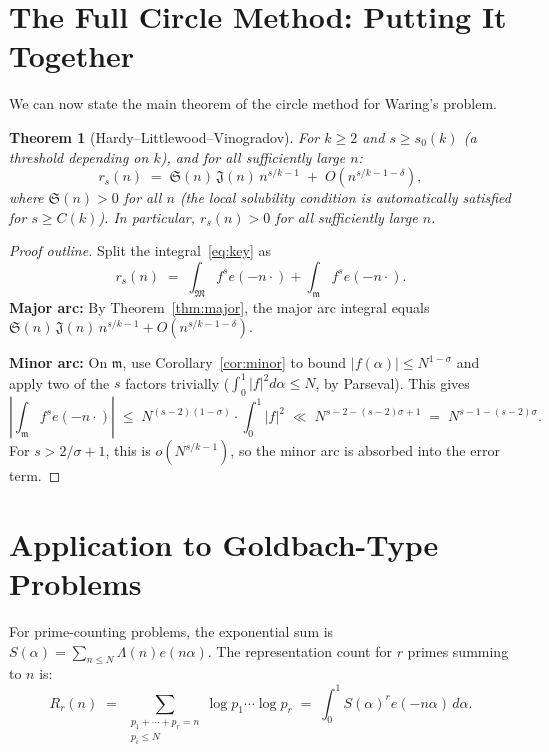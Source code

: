 \documentclass[12pt,a4paper]{amsart}
\newtheorem{theorem}{Theorem}[section]
\theoremstyle{definition}
\newcommand{\eq}[1]{e\!\left(#1\right)}
\begin{document}
\section{The Full Circle Method: Putting It Together}
\label{sec:full}

We can now state the main theorem of the circle method for Waring's problem.

\begin{theorem}[Hardy--Littlewood--Vinogradov]\label{thm:main}
  For $k \geq 2$ and $s \geq s_0(k)$ (a threshold depending on $k$),
  and for all sufficiently large $n$:
  \[
    r_s(n) \;=\; \mathfrak{S}(n)\, \mathfrak{J}(n)\, n^{s/k - 1}
                 \;+\; O\!\left(n^{s/k - 1 - \delta}\right),
  \]
  where $\mathfrak{S}(n) > 0$ for all $n$ (the local solubility condition
  is automatically satisfied for $s \geq C(k)$).  In particular,
  $r_s(n) > 0$ for all sufficiently large $n$.
\end{theorem}

\begin{proof}[Proof outline]
  Split the integral~\eqref{eq:key} as
  \[
    r_s(n) \;=\; \int_{\mathfrak{M}} f^s \eq{-n\cdot} + \int_{\mathfrak{m}} f^s \eq{-n\cdot}.
  \]
  \textbf{Major arc:} By Theorem~\ref{thm:major}, the major arc integral
  equals $\mathfrak{S}(n)\, \mathfrak{J}(n)\, n^{s/k-1} + O(n^{s/k-1-\delta})$.

  \textbf{Minor arc:} On $\mathfrak{m}$, use Corollary~\ref{cor:minor}
  to bound $|f(\alpha)| \leq N^{1-\sigma}$ and apply two of the $s$ factors
  trivially ($\int_0^1 |f|^2 d\alpha \leq N$, by Parseval).  This gives
  \[
    \left|\int_{\mathfrak{m}} f^s \eq{-n\cdot}\right|
    \;\leq\; N^{(s-2)(1-\sigma)} \cdot \int_0^1 |f|^2
    \;\ll\; N^{s-2-(s-2)\sigma + 1}
    \;=\; N^{s-1-(s-2)\sigma}.
  \]
  For $s > 2/\sigma + 1$, this is $o(N^{s/k - 1})$, so the minor arc is
  absorbed into the error term.
\end{proof}

\section{Application to Goldbach-Type Problems}
\label{sec:goldbach}

For prime-counting problems, the exponential sum is
$S(\alpha) = \sum_{n \leq N} \Lambda(n) \eq{n\alpha}$.
The representation count for $r$ primes summing to $n$ is:
\[
  R_r(n) \;=\; \sum_{\substack{p_1 + \cdots + p_r = n\\ p_i \leq N}}
               \log p_1 \cdots \log p_r
  \;=\; \int_0^1 S(\alpha)^r \eq{-n\alpha}\, d\alpha.
\]
\end{document}
